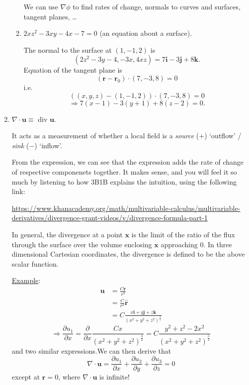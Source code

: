 \documentclass[12pt]{report}
\theoremstyle{definition}
\begin{document}
\begin{enumerate}[label = (\arabic*)]
\begin{enumerate}[label = (\alph*)]
                We can use $\nabla\phi$ to find rates of change, normals to curves and surfaces, tangent planes, \ldots
    
            \item $2xz^{2} - 3xy - 4x - 7 = 0$ (an equation about a surface).

                The normal to the surface at $(1, -1, 2)$ is\[
                    (2z^{2}-3y-4, -3x, 4xz) = 7\mathbf{i} - 3\mathbf{j} + 8\mathbf{k}.
                \]
                Equation of the tangent plane is\[
                    (\mathbf{r} - \mathbf{r}_0)\cdot(7, -3, 8) = 0
                \]i.e.\ \[
                ((x, y, z) - (1, -1, 2))\cdot(7, -3, 8) = 0
                \]\[
                \Rightarrow{}7(x-1) - 3(y+1) + 8(z-2) = 0.
                \]
        \end{enumerate}
        
    \item $\nabla\cdot\mathbf{u} \equiv$ div $\mathbf{u}$.

        It acts as a measurement of whether a local field is a
        \emph{source} ($+$) `outflow' / \emph{sink} ($-$) `inflow'.

        From the expression, we can see that the expression adds
        the rate of change of respective componenets together.
        It makes sense, and you will feel it so much by listening to
        how 3B1B explains the intuition, using the following link:

        \ul{https://www.khanacademy.org/math/multivariable-calculus/multivariable-derivatives/divergence-grant-videos/v/divergence-formula-part-1}

        In general, the divergence at a point $\mathbf{x}$ is
        the limit of the ratio of the flux through the surface
        over the volume enclosing $\mathbf{x}$ approaching 0.
        In three dimensional Cartesian coordinates, the divergence
        is defined to be the above scalar function.

        \underline{Example}:\[
            \begin{align*}
                \mathbf{u} & = \frac{C\mathbf{r}}{r^{3}} \\
                           & = \frac{C}{r^{2}} \hat{\mathbf{r}} \\
                           & = C \frac{x\mathbf{i}+y\mathbf{j}+z\mathbf{k}}
                           {{(x^{2}+y^{2}+z^{2})}^{\frac{3}{2}}}
            \end{align*}
        \]\[
            \Rightarrow{}\frac{\partial u_1}{\partial x} 
            = \frac{\partial}{\partial x}\frac{Cx}{{(x^{2}+y^{2}+z^{2})}^{\frac{3}{2}}}
            = C \frac{y^{2}+z^{2}-2x^{2}}{{(x^{2}+y^{2}+z^{2})}^{\frac{5}{2}}}
        \]and two similar expressions.We can then derive that\[
            \nabla\cdot\mathbf{u}=\frac{\partial u_1}{\partial x}
            + \frac{\partial u_2}{\partial y} + \frac{\partial u_3}{\partial z} = 0
        \]except at $\mathbf{r} = 0$, where $\nabla\cdot\mathbf{u}$ is infinite!
        

\end{enumerate}
\end{document}

